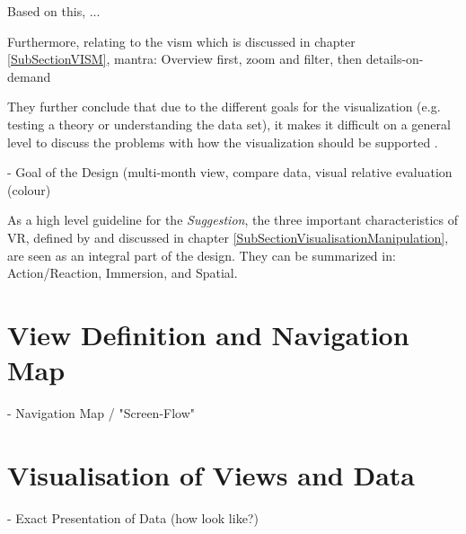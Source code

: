 {	
Based on this, ...


Furthermore, relating to the \gls{vism} which is discussed in chapter \ref{SubSectionVISM}, 
mantra: Overview first, zoom and filter, then details-on-demand

They further conclude that due to the different goals for the visualization (e.g. testing a theory or understanding the data set), it makes it difficult on a general level to discuss the problems with how the visualization should be supported \citep{Stone1994}.


- Goal of the Design (multi-month view, compare data, visual relative evaluation (colour)

As a high level guideline for the \textit{Suggestion}, the three important characteristics of VR, defined by \cite{Stone1994} and discussed in chapter \ref{SubSectionVisualisationManipulation}, are seen as an integral part of the design. They can be summarized in: Action/Reaction, Immersion, and Spatial. \newline








\section{View Definition and Navigation Map}


- Navigation Map / "Screen-Flow"




\section{Visualisation of Views and Data}

- Exact Presentation of Data (how look like?)



}
